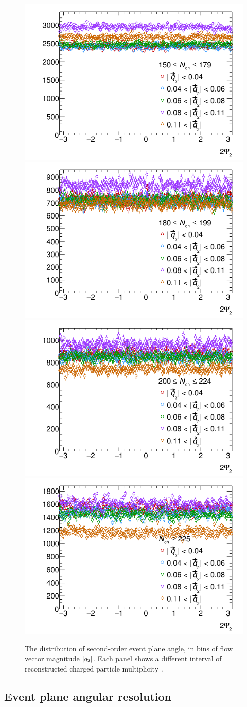 \begin{figure}[t]
\centering
\includegraphics[width=.49\linewidth]{can_psi2_Nch150to179.png}
\includegraphics[width=.49\linewidth]{can_psi2_Nch180to199.png}
\includegraphics[width=.49\linewidth]{can_psi2_Nch200to224.png}
\includegraphics[width=.49\linewidth]{can_psi2_Nch225.png}
\caption{The distribution of second-order event plane angle, in bins of flow vector magnitude $|q_{2}|$. Each panel shows a different interval of reconstructed charged particle multiplicity \Nch.}
\label{fig:dNdpsi2_corr_binned}
\end{figure}


\subsection{Event plane angular resolution}
\label{subsubsec:epres}

